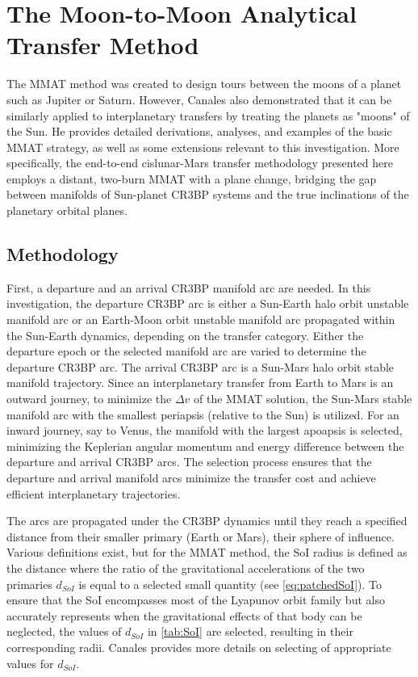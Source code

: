 \section{The Moon-to-Moon Analytical Transfer Method}\label{sec:MMAT}
The MMAT method was created to design tours between the moons of a planet such as Jupiter or
Saturn. However, Canales also demonstrated that it can be similarly applied to interplanetary
transfers by treating the planets as "moons" of the Sun. He provides detailed derivations,
analyses, and examples of the basic MMAT strategy, as well as some extensions relevant to this
investigation\cite{Canales:2021a,Canales:2021b,Canales:2022}. More specifically, the end-to-end
cislunar-Mars transfer methodology presented here employs a distant, two-burn MMAT with a plane
change, bridging the gap between manifolds of Sun-planet CR3BP systems and the true inclinations of
the planetary orbital planes.

\subsection{Methodology}
First, a departure and an arrival CR3BP manifold arc are needed. In this investigation, the
departure CR3BP arc is either a Sun-Earth halo orbit unstable manifold arc or an Earth-Moon orbit
unstable manifold arc propagated within the Sun-Earth dynamics, depending on the transfer category.
Either the departure epoch or the selected manifold arc are varied to determine the departure CR3BP
arc. The arrival CR3BP arc is a Sun-Mars halo orbit stable manifold trajectory. Since an
interplanetary transfer from Earth to Mars is an outward journey, to minimize the $\Delta v$ of the
MMAT solution, the Sun-Mars stable manifold arc with the smallest periapsis (relative to the Sun)
is utilized\cite{Canales:2021b}. For an inward journey, say to Venus, the manifold with the largest
apoapsis is selected, minimizing the Keplerian angular momentum and energy difference between the
departure and arrival CR3BP arcs. The selection process ensures that the departure and arrival
manifold arcs minimize the transfer cost and achieve efficient interplanetary trajectories.

The arcs are propagated under the CR3BP dynamics until they reach a specified distance from their
smaller primary (Earth or Mars), their sphere of influence. Various definitions exist, but for the
MMAT method, the SoI radius is defined as the distance where the ratio of the gravitational
accelerations of the two primaries $d_{SoI}$ is equal to a selected small quantity (see
\cref{eq:patchedSoI})\cite{Canales:2021b}. To ensure that the SoI encompasses most of the Lyapunov
orbit family but also accurately represents when the gravitational effects of that body can be
neglected, the values of $d_{SoI}$ in \cref{tab:SoI} are selected, resulting in their corresponding
radii. Canales provides more details on selecting of appropriate values for
$d_{SoI}$\cite{Canales:2021b}.

